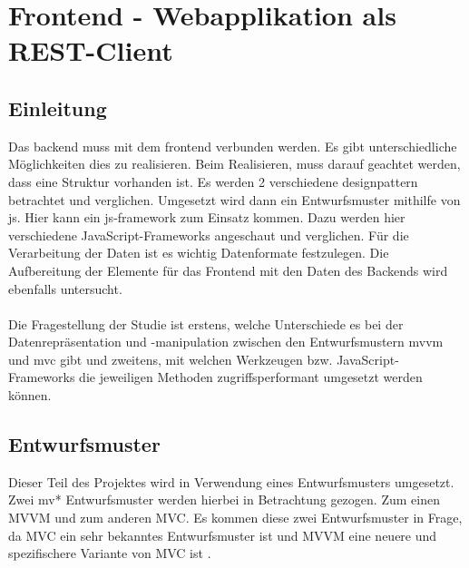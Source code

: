 
\section{Frontend - Webapplikation als REST-Client}
\subsection{Einleitung}
Das \Gls{backend} muss mit dem \Gls{frontend} verbunden werden. Es gibt unterschiedliche Möglichkeiten dies zu realisieren. Beim Realisieren, muss darauf geachtet werden, dass eine Struktur vorhanden ist. Es werden 2 verschiedene \Gls{designpattern} betrachtet und verglichen. Umgesetzt wird dann ein Entwurfsmuster mithilfe von \Gls{js}. Hier kann ein \Gls{js}-\Gls{framework} zum Einsatz kommen. Dazu werden hier verschiedene JavaScript-Frameworks angeschaut und verglichen. Für die Verarbeitung der Daten ist es wichtig Datenformate festzulegen. Die Aufbereitung der Elemente für das Frontend mit den Daten des Backends wird ebenfalls untersucht.
\\\\
Die Fragestellung der Studie ist erstens, welche Unterschiede es bei der Datenrepräsentation und -manipulation zwischen den Entwurfsmustern \Gls{mvvm} und \Gls{mvc} gibt und zweitens, mit welchen Werkzeugen bzw. JavaScript-Frameworks die jeweiligen Methoden zugriffsperformant umgesetzt werden können.
\subsection{Entwurfsmuster}
Dieser Teil des Projektes wird in Verwendung eines Entwurfsmusters umgesetzt. Zwei \Gls{mv*} Entwurfsmuster werden hierbei in Betrachtung gezogen. Zum einen MVVM und zum anderen MVC. Es kommen diese zwei Entwurfsmuster in Frage, da MVC ein sehr bekanntes Entwurfsmuster ist und MVVM eine neuere und spezifischere Variante von MVC ist \cite{mvvm_vue}.
